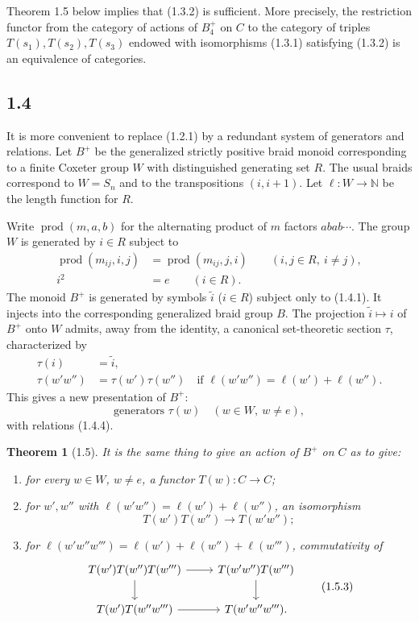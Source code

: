 \documentclass[11pt]{article}
\newtheorem{theorem}{Theorem}[section]
\newcommand{\prodword}{\operatorname{prod}}
\begin{document}
Theorem 1.5 below implies that (1.3.2) is sufficient. More precisely, the restriction functor from the category of actions of $B_4^+$ on $C$ to the category of triples $T(s_1),T(s_2),T(s_3)$ endowed with isomorphisms (1.3.1) satisfying (1.3.2) is an equivalence of categories.

\subsection*{1.4}
It is more convenient to replace (1.2.1) by a redundant system of generators and relations. Let $B^+$ be the generalized strictly positive braid monoid corresponding to a finite Coxeter group $W$ with distinguished generating set $R$. The usual braids correspond to $W=S_n$ and to the transpositions $(i,i+1)$. Let $\ell:W\to\mathbb N$ be the length function for $R$.

Write $\prodword(m,a,b)$ for the alternating product of $m$ factors $abab\cdots$. The group $W$ is generated by $i\in R$ subject to
\begin{align}
\prodword(m_{ij},i,j)&=\prodword(m_{ij},j,i)\qquad (i,j\in R,\ i\ne j),\tag{1.4.1}\\
i^2&=e \qquad (i\in R).\tag{1.4.2}
\end{align}
The monoid $B^+$ is generated by symbols $\tilde i$ ($i\in R$) subject only to (1.4.1). It injects into the corresponding generalized braid group $B$. The projection $\tilde i\mapsto i$ of $B^+$ onto $W$ admits, away from the identity, a canonical set-theoretic section $\tau$, characterized by
\begin{align}
\tau(i)&=\tilde i,\tag{1.4.3}\\
\tau(w'w'')&=\tau(w')\tau(w'')\quad\text{if }\ell(w'w'')=\ell(w')+\ell(w'').\tag{1.4.4}
\end{align}
This gives a new presentation of $B^+$:
\[
\text{generators }\tau(w)\quad (w\in W,\ w\ne e),\tag{1.4.5}
\]
with relations (1.4.4).

\begin{theorem}[1.5]
It is the same thing to give an action of $B^+$ on $C$ as to give:
\begin{enumerate}
\item for every $w\in W$, $w\ne e$, a functor $T(w):C\to C$;
\item for $w',w''$ with $\ell(w'w'')=\ell(w')+\ell(w'')$, an isomorphism
\[
T(w')T(w'')\longrightarrow T(w'w'');
\]
\item for $\ell(w'w''w''')=\ell(w')+\ell(w'')+\ell(w''')$, commutativity of
\[
\begin{tikzcd}
T(w')T(w'')T(w''') \arrow[r] \arrow[d] & T(w'w'')T(w''') \arrow[d]\\
T(w')T(w''w''') \arrow[r] & T(w'w''w''').
\end{tikzcd}\tag{1.5.3}
\]
\end{enumerate}
\end{theorem}
\end{document}
